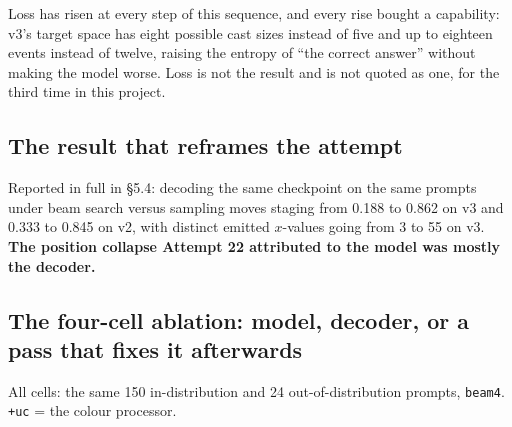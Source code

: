 \documentclass[11pt]{article}
\newcommand{\secsym}{\S}
\begin{document}
Loss has risen at every step of this sequence, and every rise bought a
capability: v3's target space has eight possible cast sizes instead of
five and up to eighteen events instead of twelve, raising the entropy of
``the correct answer'' without making the model worse. Loss is not the
result and is not quoted as one, for the third time in this project.

\subsection{The result that reframes the attempt}
\label{sec:reframes}

Reported in full in \secsym5.4: decoding the same checkpoint on the same
prompts under beam search versus sampling moves staging from 0.188 to
0.862 on v3 and 0.333 to 0.845 on v2, with distinct emitted $x$-values
going from 3 to 55 on v3. \textbf{The position collapse Attempt 22
attributed to the model was mostly the decoder.}

\subsection{The four-cell ablation: model, decoder, or a pass that fixes it afterwards}
\label{sec:fourcell}

All cells: the same 150 in-distribution and 24 out-of-distribution
prompts, \texttt{beam4}. \texttt{+uc} = the colour processor.
\end{document}
